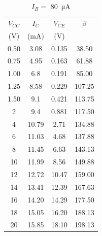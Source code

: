 \begin{table}[hbtp]
  \centering
  \begin{tabular}{cccc}
    $V_{CC}$ & $I_C$     & $V_{CE}$ & $\beta$ \\
    (\si{V}) & (\si{mA}) & (\si{V}) &         \\
    \hline
    0.50     & 3.08      & 0.135    & 38.50   \\
    0.75     & 4.95      & 0.163    & 61.88   \\
    1.00     & 6.8       & 0.191    & 85.00   \\
    1.25     & 8.58      & 0.229    & 107.25  \\
    1.50     & 9.1       & 0.421    & 113.75  \\
    2        & 9.4       & 0.881    & 117.50  \\
    4        & 10.79     & 2.71     & 134.88  \\
    6        & 11.03     & 4.68     & 137.88  \\
    8        & 11.45     & 6.63     & 143.13  \\
    10       & 11.99     & 8.56     & 149.88  \\
    12       & 12.72     & 10.47    & 159.00  \\
    14       & 13.41     & 12.39    & 167.63  \\
    16       & 14.20     & 14.29    & 177.50  \\
    18       & 15.05     & 16.20    & 188.13  \\
    20       & 15.85     & 18.10    & 198.13  \\
  \end{tabular}
  \caption{\label{tab:3}$I_B = $ \SI{80}{\micro\ampere}}
\end{table}

